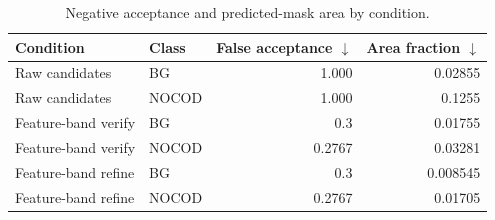 \begin{table}[htbp]
\centering
\caption{Negative acceptance and predicted-mask area by condition.}
\label{tab:negativearea}
\small
\begin{tabular}{llrr}
\toprule
\textbf{Condition} & \textbf{Class} & \textbf{False acceptance $\downarrow$} & \textbf{Area fraction $\downarrow$} \\
\midrule
Raw candidates & BG & 1.000 & 0.02855 \\
Raw candidates & NOCOD & 1.000 & 0.1255 \\
Feature-band verify & BG & 0.3 & 0.01755 \\
Feature-band verify & NOCOD & 0.2767 & 0.03281 \\
Feature-band refine & BG & 0.3 & 0.008545 \\
Feature-band refine & NOCOD & 0.2767 & 0.01705 \\
\bottomrule
\end{tabular}

\par{}
\end{table}
